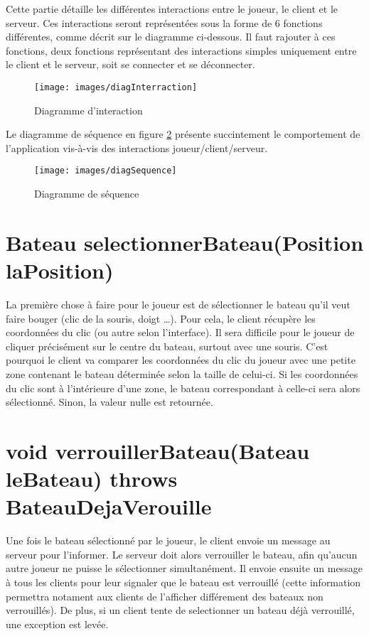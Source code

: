 Cette partie détaille les différentes interactions entre le joueur, le client et le serveur. Ces interactions seront représentées sous la forme de 6 fonctions différentes, comme décrit sur le diagramme ci-dessous. Il faut rajouter à ces fonctions, deux fonctions représentant des interactions simples uniquement entre le client et le serveur, soit se connecter et se déconnecter.

\begin{figure}[h]
	\begin{center}
		\texttt{[image: images/diagInterraction]}
	\end{center}
	\caption{Diagramme d'interaction}
	\label{fig:interaction}
\end{figure}

Le diagramme de séquence en figure \ref{fig:sequence} présente succintement le comportement de l'application vis-à-vis des interactions joueur/client/serveur.
\begin{figure}[htbp]
  \centering
  \texttt{[image: images/diagSequence]}
  \caption{Diagramme de séquence}
  \label{fig:sequence}
\end{figure}

\section{Bateau selectionnerBateau(Position laPosition)}

La première chose à faire pour le joueur est de sélectionner le bateau qu'il veut faire bouger (clic de la souris, doigt \dots{}). Pour cela, le client récupère les coordonnées du clic (ou autre selon l'interface). Il sera difficile pour le joueur de cliquer précisément sur le centre du bateau, surtout avec une souris. C'est pourquoi le client va comparer les coordonnées du clic du joueur avec une petite zone contenant le bateau déterminée selon la taille de celui-ci. Si les coordonnées du clic sont à l'intérieure d'une zone, le bateau correspondant à celle-ci sera alors sélectionné. Sinon, la valeur nulle est retournée.

\section{void verrouillerBateau(Bateau leBateau) throws BateauDejaVerouille}

Une fois le bateau sélectionné par le joueur, le client envoie un message au serveur pour l'informer. Le serveur doit alors verrouiller le bateau, afin qu'aucun autre joueur ne puisse le sélectionner simultanément. Il envoie ensuite un message à tous les clients pour leur signaler que le  bateau est verrouillé (cette information permettra notament aux clients de l'afficher différement des bateaux non verrouillés). De plus, si un client tente de selectionner un bateau déjà verrouillé, une exception est levée.  

